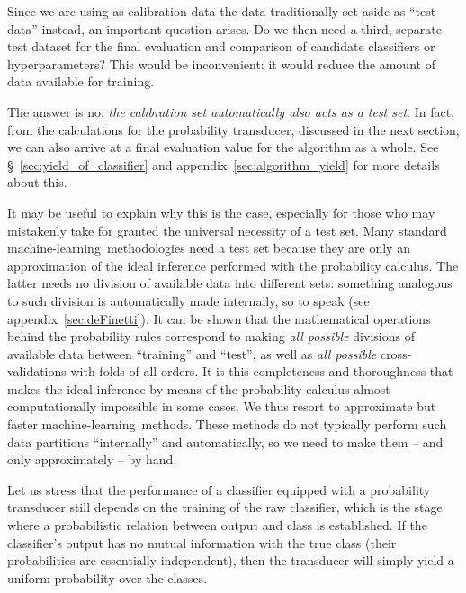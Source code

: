 \documentclass[a4paper,12pt,%
onecolumn,oneside,article,%
british%
]{memoir}
\renewcommand*{\|}[1][]{\nonscript\:#1\vert\nonscript\:\mathopen{}}
\newcommand*{\sect}{\S}%
\newcommand*{\ml}{machine-learning}
\begin{document}
\medskip

Since we are using as calibration data the data traditionally set aside as \enquote{test data} instead, an important question arises. Do we then need a third, separate test dataset for the final evaluation and comparison of candidate classifiers or hyperparameters? This would be inconvenient: it would reduce the amount of data available for training.

The answer is no: \emph{the calibration set automatically also acts as a test set}. In fact, from the calculations for the probability transducer, discussed in the next section, we can also arrive at a final evaluation value for the algorithm as a whole. See \sect~\ref{sec:yield_of_classifier} and appendix~\ref{sec:algorithm_yield} for more details about this.

It may be useful to explain why this is the case, especially for those who may mistakenly take for granted the universal necessity of a test set. Many standard \ml\ methodologies need a test set because they are only an approximation of the ideal inference performed with the probability calculus. The latter needs no division of available data into different sets: something analogous to such division is automatically made internally, so to speak (see appendix~\ref{sec:deFinetti}). It can be shown \autocites{portamana2019b,fongetal2020,wald1949}[many examples of this fact are scattered across the text by][]{jaynes1994_r2003} that the mathematical operations behind the probability rules correspond to making \emph{all possible} divisions of available data between \enquote{training} and \enquote{test}, as well as \emph{all possible} cross-validations with folds of all orders. It is this completeness and thoroughness that makes the ideal inference by means of the probability calculus almost computationally impossible in some cases. We thus resort to approximate but faster \ml\ methods. These methods do not typically perform such data partitions \enquote{internally} and automatically, so we need to make them -- and only approximately -- by hand.

\medskip

Let us stress that the performance of a classifier equipped with a probability transducer still depends on the training of the raw classifier, which is the stage where a probabilistic relation between output and class is established. If the classifier's output has no mutual information with the true class (their probabilities are essentially independent), then the transducer will simply yield a uniform probability over the classes.
\end{document}

